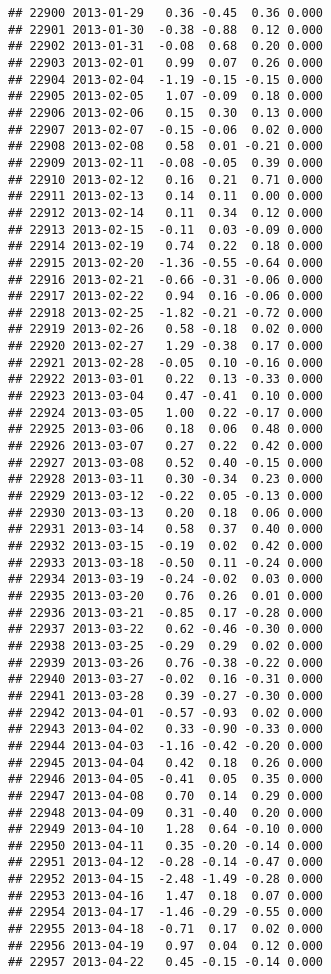 \documentclass[
]{article}
\begin{document}
\begin{verbatim}
## 22900 2013-01-29   0.36 -0.45  0.36 0.000
## 22901 2013-01-30  -0.38 -0.88  0.12 0.000
## 22902 2013-01-31  -0.08  0.68  0.20 0.000
## 22903 2013-02-01   0.99  0.07  0.26 0.000
## 22904 2013-02-04  -1.19 -0.15 -0.15 0.000
## 22905 2013-02-05   1.07 -0.09  0.18 0.000
## 22906 2013-02-06   0.15  0.30  0.13 0.000
## 22907 2013-02-07  -0.15 -0.06  0.02 0.000
## 22908 2013-02-08   0.58  0.01 -0.21 0.000
## 22909 2013-02-11  -0.08 -0.05  0.39 0.000
## 22910 2013-02-12   0.16  0.21  0.71 0.000
## 22911 2013-02-13   0.14  0.11  0.00 0.000
## 22912 2013-02-14   0.11  0.34  0.12 0.000
## 22913 2013-02-15  -0.11  0.03 -0.09 0.000
## 22914 2013-02-19   0.74  0.22  0.18 0.000
## 22915 2013-02-20  -1.36 -0.55 -0.64 0.000
## 22916 2013-02-21  -0.66 -0.31 -0.06 0.000
## 22917 2013-02-22   0.94  0.16 -0.06 0.000
## 22918 2013-02-25  -1.82 -0.21 -0.72 0.000
## 22919 2013-02-26   0.58 -0.18  0.02 0.000
## 22920 2013-02-27   1.29 -0.38  0.17 0.000
## 22921 2013-02-28  -0.05  0.10 -0.16 0.000
## 22922 2013-03-01   0.22  0.13 -0.33 0.000
## 22923 2013-03-04   0.47 -0.41  0.10 0.000
## 22924 2013-03-05   1.00  0.22 -0.17 0.000
## 22925 2013-03-06   0.18  0.06  0.48 0.000
## 22926 2013-03-07   0.27  0.22  0.42 0.000
## 22927 2013-03-08   0.52  0.40 -0.15 0.000
## 22928 2013-03-11   0.30 -0.34  0.23 0.000
## 22929 2013-03-12  -0.22  0.05 -0.13 0.000
## 22930 2013-03-13   0.20  0.18  0.06 0.000
## 22931 2013-03-14   0.58  0.37  0.40 0.000
## 22932 2013-03-15  -0.19  0.02  0.42 0.000
## 22933 2013-03-18  -0.50  0.11 -0.24 0.000
## 22934 2013-03-19  -0.24 -0.02  0.03 0.000
## 22935 2013-03-20   0.76  0.26  0.01 0.000
## 22936 2013-03-21  -0.85  0.17 -0.28 0.000
## 22937 2013-03-22   0.62 -0.46 -0.30 0.000
## 22938 2013-03-25  -0.29  0.29  0.02 0.000
## 22939 2013-03-26   0.76 -0.38 -0.22 0.000
## 22940 2013-03-27  -0.02  0.16 -0.31 0.000
## 22941 2013-03-28   0.39 -0.27 -0.30 0.000
## 22942 2013-04-01  -0.57 -0.93  0.02 0.000
## 22943 2013-04-02   0.33 -0.90 -0.33 0.000
## 22944 2013-04-03  -1.16 -0.42 -0.20 0.000
## 22945 2013-04-04   0.42  0.18  0.26 0.000
## 22946 2013-04-05  -0.41  0.05  0.35 0.000
## 22947 2013-04-08   0.70  0.14  0.29 0.000
## 22948 2013-04-09   0.31 -0.40  0.20 0.000
## 22949 2013-04-10   1.28  0.64 -0.10 0.000
## 22950 2013-04-11   0.35 -0.20 -0.14 0.000
## 22951 2013-04-12  -0.28 -0.14 -0.47 0.000
## 22952 2013-04-15  -2.48 -1.49 -0.28 0.000
## 22953 2013-04-16   1.47  0.18  0.07 0.000
## 22954 2013-04-17  -1.46 -0.29 -0.55 0.000
## 22955 2013-04-18  -0.71  0.17  0.02 0.000
## 22956 2013-04-19   0.97  0.04  0.12 0.000
## 22957 2013-04-22   0.45 -0.15 -0.14 0.000

\end{verbatim}
\end{document}
